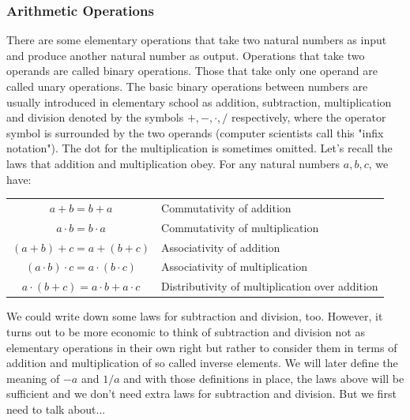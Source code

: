 \subsubsection{Arithmetic Operations}
There are some elementary operations that take two natural numbers as input and produce another natural number as output. Operations that take two operands are called binary operations. Those that take only one operand are called unary operations. The basic binary operations between numbers are usually introduced in elementary school as addition, subtraction, multiplication and division denoted by the symbols $+,-,\cdot,/$ respectively, where the operator symbol is surrounded by the two operands (computer scientists call this "infix notation"). The dot for the multiplication is sometimes omitted. Let's recall the laws that addition and multiplication obey. For any natural numbers $a,b,c$, we have:

\label{Sec:ArithmeticLaws}
\medskip
\begin{tabular}{c l}
  $a + b = b + a$                             & Commutativity of addition \\
  $a \cdot b = b \cdot a$                     & Commutativity of multiplication \\
  $(a + b) + c = a + (b + c)$                 & Associativity of addition \\
  $(a \cdot b) \cdot c = a \cdot (b \cdot c)$ & Associativity of multiplication \\
  $a \cdot (b + c) = a \cdot b + a \cdot c$   & Distributivity of multiplication over addition
\end{tabular}
\medskip

We could write down some laws for subtraction and division, too. However, it turns out to be more economic to think of subtraction and division not as elementary operations in their own right but rather to consider them in terms of addition and multiplication of so called inverse elements. We will later define the meaning of $-a$ and $1/a$ and with those definitions in place, the laws above will be sufficient and we don't need extra laws for subtraction and division. But we first need to talk about...


